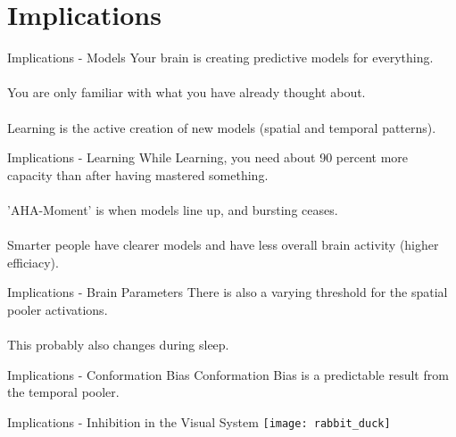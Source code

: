 \section{Implications}


\begin{frame}[c]{Implications - Models}
    \Large
    Your brain is creating predictive models for everything. \\ \\
    \pause
    You are only familiar with what you have already thought about. \\ \\
    \pause
    Learning is the active creation of new models (spatial and temporal patterns).
\end{frame}


\begin{frame}[c]{Implications - Learning}
    \Large
    While Learning, you need about 90 percent more capacity than after having mastered something. \\ \\
    \pause
    'AHA-Moment' is when models line up, and bursting ceases. \\ \\
    \pause
    Smarter people have clearer models and have less overall brain activity (higher efficiacy).
\end{frame}


\begin{frame}[c]{Implications - Brain Parameters}
    \Large
    There is also a varying threshold for the spatial pooler activations. \\ \\
    \pause
    This probably also changes during sleep.
\end{frame}



\begin{frame}[c]{Implications - Conformation Bias}
    \Large
    Conformation Bias is a predictable result from the temporal pooler.
\end{frame}


\begin{frame}[c]{Implications - Inhibition in the Visual System}
    \texttt{[image: rabbit\_duck]}
\end{frame}


